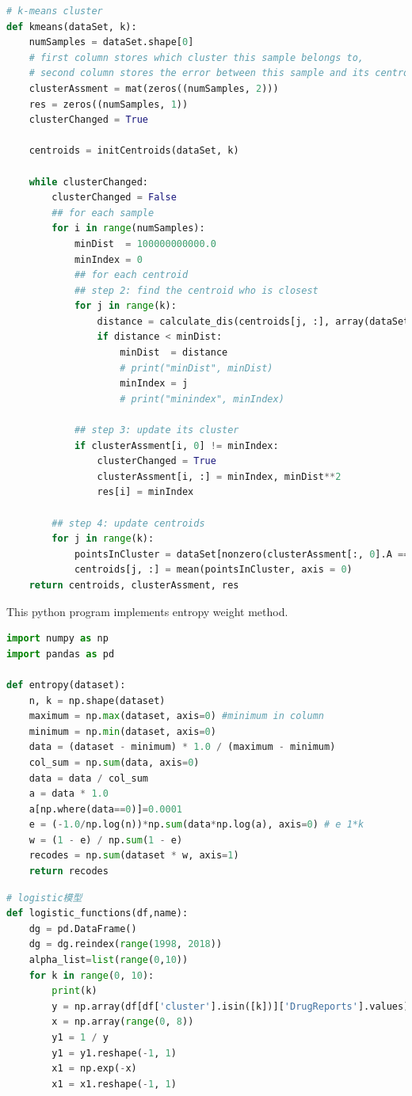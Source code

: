 \documentclass[12pt]{article}
\begin{document}
\begin{appendices}
\begin{lstlisting}[language={python}, caption=\texttt{k-means.py}]
# k-means cluster
def kmeans(dataSet, k):
	numSamples = dataSet.shape[0]
	# first column stores which cluster this sample belongs to,
	# second column stores the error between this sample and its centroid
	clusterAssment = mat(zeros((numSamples, 2)))
	res = zeros((numSamples, 1))
	clusterChanged = True

	centroids = initCentroids(dataSet, k)

	while clusterChanged:
		clusterChanged = False
		## for each sample
		for i in range(numSamples):
			minDist  = 100000000000.0
			minIndex = 0
			## for each centroid
			## step 2: find the centroid who is closest
			for j in range(k):
				distance = calculate_dis(centroids[j, :], array(dataSet[i])[0]) #convert to array
				if distance < minDist:
					minDist  = distance
					# print("minDist", minDist)
					minIndex = j
					# print("minindex", minIndex)
			
			## step 3: update its cluster
			if clusterAssment[i, 0] != minIndex:
				clusterChanged = True
				clusterAssment[i, :] = minIndex, minDist**2
				res[i] = minIndex

		## step 4: update centroids
		for j in range(k):
			pointsInCluster = dataSet[nonzero(clusterAssment[:, 0].A == j)[0]]
			centroids[j, :] = mean(pointsInCluster, axis = 0)
	return centroids, clusterAssment, res
\end{lstlisting}

This python program implements entropy weight method.
\begin{lstlisting}[language={python}, caption=\texttt{entropy-weight.py}]
import numpy as np
import pandas as pd

def entropy(dataset):
    n, k = np.shape(dataset)
    maximum = np.max(dataset, axis=0) #minimum in column
    minimum = np.min(dataset, axis=0)
    data = (dataset - minimum) * 1.0 / (maximum - minimum)
    col_sum = np.sum(data, axis=0)
    data = data / col_sum
    a = data * 1.0
    a[np.where(data==0)]=0.0001
    e = (-1.0/np.log(n))*np.sum(data*np.log(a), axis=0) # e 1*k
    w = (1 - e) / np.sum(1 - e)
    recodes = np.sum(dataset * w, axis=1)
    return recodes
\end{lstlisting}
% 

\begin{lstlisting}[language={python}, caption=\texttt{Logistic Model}]
# logistic模型
def logistic_functions(df,name):
	dg = pd.DataFrame()
	dg = dg.reindex(range(1998, 2018))
	alpha_list=list(range(0,10))
	for k in range(0, 10):
		print(k)
		y = np.array(df[df['cluster'].isin([k])]['DrugReports'].values)
		x = np.array(range(0, 8))
		y1 = 1 / y
		y1 = y1.reshape(-1, 1)
		x1 = np.exp(-x)
		x1 = x1.reshape(-1, 1)


\end{lstlisting}
\end{appendices}
\end{document}
